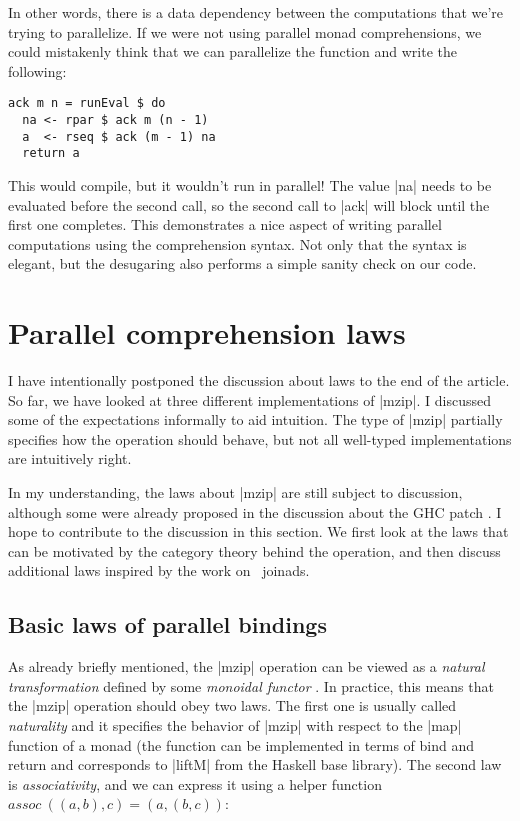 \documentclass{tmr}
\newcommand{\authornote}[3]{}
\newcommand\bay[1]{\authornote{brent}{blue}{#1}}
\newcommand\tp[1]{\authornote{tomas}{red}{#1}}
\newcommand{\assoc}{\mathit{assoc}}
\begin{document}
In other words, there is a data dependency between the computations that we're trying to 
parallelize. If we were not using parallel monad comprehensions, we could mistakenly think 
that we can parallelize the function and write the following:

\begin{verbatim}
ack m n = runEval $ do 
  na <- rpar $ ack m (n - 1)
  a  <- rseq $ ack (m - 1) na
  return a
\end{verbatim}
This would compile, but it wouldn't run in parallel! The value |na| needs to be evaluated before 
the second call, so the second call to |ack| will block until the first one completes. This 
demonstrates a nice aspect of writing parallel computations using the comprehension syntax. 
Not only that the syntax is elegant, but the desugaring also performs a simple sanity check on our code.


\section{Parallel comprehension laws}
I have intentionally postponed the discussion about laws to the end of
the article. So far, we have looked
at three different implementations of |mzip|. I discussed some of the expectations
informally to aid intuition. The type of |mzip| partially specifies how 
the operation should behave, but not all well-typed implementations are intuitively right.

In my understanding, the laws about |mzip| are still subject to discussion, although some were 
already proposed in the discussion about the GHC patch \cite{bringbackmc}. I hope to contribute to
the discussion in this section. We first look at the laws that can be
motivated by the category theory
behind the operation, and then discuss additional laws inspired by the work on 
\fsharp \ joinads.


\subsection{Basic laws of parallel bindings}
As already briefly mentioned, the |mzip| operation can be viewed as a \textit{natural 
transformation} defined by some \textit{monoidal functor}
\cite{monoidalfunctor}. \bay{I don't recall anything about natural
  transformations being mentioned yet.} \tp{The correction that I did at the end of the parser section
  now says that they are natural transformations, so it should be correct.} In practice,
this means that the |mzip| operation should obey two laws. The first one is usually called 
\textit{naturality} and it specifies the behavior of |mzip| with respect to the |map| function of 
a monad (the function can be implemented in terms of bind and return and corresponds to 
|liftM| from the Haskell base library). The second law is \textit{associativity}, and we can express it 
using a helper function $\assoc\ ((a,b),c)=(a,(b,c))$:
\end{document}
